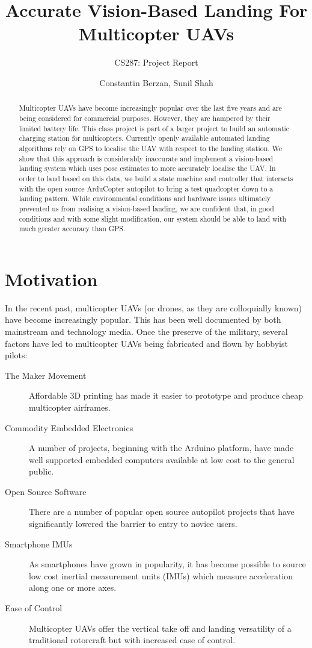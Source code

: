 \documentclass[10pt]{scrartcl} %
\title{Accurate Vision-Based Landing For Multicopter UAVs}
\subtitle{CS287: Project Report}
\author{Constantin Berzan, Sunil Shah}
\date{}
\begin{document}
\maketitle

\begin{abstract}
Multicopter UAVs have become increasingly popular over the last five years and are being considered for commercial purposes. However, they are hampered by their limited battery life. This class project is part of a larger project to build an automatic charging station for multicopters. Currently openly available automated landing algorithms rely on GPS to localise the UAV with respect to the landing station. We show that this approach is considerably inaccurate and implement a vision-based landing system which uses pose estimates to more accurately localise the UAV. 
In order to land based on this data, we build a state machine and controller that interacts with the open source ArduCopter autopilot to bring a test quadcopter down to a landing pattern. While environmental conditions and hardware issues ultimately prevented us from realising a vision-based landing, we are confident that, in good conditions and with some slight modification, our system should be able to land with much greater accuracy than GPS.
\end{abstract}
\section{Motivation}
In the recent past, multicopter UAVs (or drones, as they are colloquially known) have become increasingly popular. This has been well documented by both mainstream and technology media. Once the preserve of the military, several factors have led to multicopter UAVs being fabricated and flown by hobbyist pilots:
\begin{description}
\item[The Maker Movement]{Affordable 3D printing has made it easier to prototype and produce cheap multicopter airframes.}
\item[Commodity Embedded Electronics]{A number of projects, beginning with the Arduino platform, have made well supported embedded computers available at low cost to the general public.}
\item[Open Source Software]{There are a number of popular open source autopilot projects that have significantly lowered the barrier to entry to novice users.}
\item[Smartphone IMUs]{As smartphones have grown in popularity, it has become possible to source low cost inertial measurement units (IMUs) which measure acceleration along one or more axes.}
\item[Ease of Control]{Multicopter UAVs offer the vertical take off and landing versatility of a traditional rotorcraft but with increased ease of control.}
\end{description}
\end{document}
